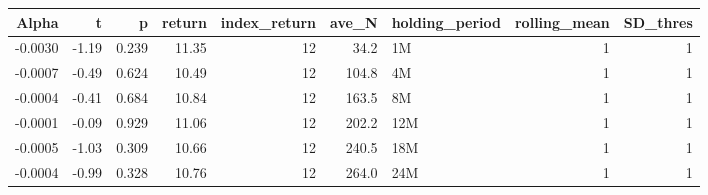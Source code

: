 \begin{table}[ht]
\centering
\begin{tabular}{rrrrrrlrr}
  \hline
Alpha & t & p & return & index\_return & ave\_N & holding\_period & rolling\_mean & SD\_thres \\ 
  \hline
    -0.0030 & -1.19 & 0.239 & 11.35 & 12 & 34.2 & 1M &  1 &  1 \\ 
  -0.0007 & -0.49 & 0.624 & 10.49 & 12 & 104.8 & 4M &  1 &  1 \\ 
  -0.0004 & -0.41 & 0.684 & 10.84 & 12 & 163.5 & 8M &  1 &  1 \\ 
  -0.0001 & -0.09 & 0.929 & 11.06 & 12 & 202.2 & 12M &  1 &  1 \\ 
  -0.0005 & -1.03 & 0.309 & 10.66 & 12 & 240.5 & 18M &  1 &  1 \\ 
  -0.0004 & -0.99 & 0.328 & 10.76 & 12 & 264.0 & 24M &  1 &  1 \\ 
   \hline
\end{tabular}
\end{table}

